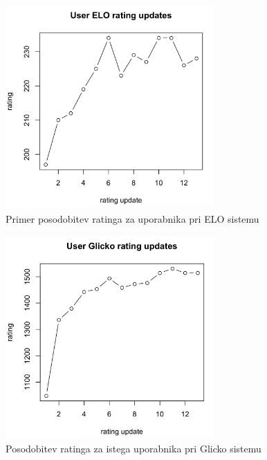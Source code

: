 \documentclass{IEEEtran}
\begin{document}
\begin{figure}[h!]
    \includegraphics[width=8cm]{EloUserExample}
    \caption{Primer posodobitev ratinga za uporabnika pri ELO sistemu}%
    \label{fig:example}%
\end{figure}
\begin{figure}[h!]
    \includegraphics[width=8cm]{GlickoUserExample}
    \caption{Posodobitev ratinga za istega uporabnika pri Glicko sistemu}%
    \label{fig:example}%
\end{figure}
\end{document}
